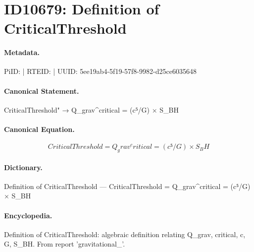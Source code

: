 \section*{ID10679: Definition of CriticalThreshold}
\paragraph{Metadata.}
PiID:  | RTEID:  | UUID: 5ee19ab4-5f19-57f8-9982-d25ce6035648

\paragraph{Canonical Statement.}
CriticalThreshold" → Q\_grav\textasciicircum{}critical = (c⁵/G) × S\_BH

\paragraph{Canonical Equation.}
\[
CriticalThreshold = Q_grav^critical = (c⁵/G) × S_BH
\]

\paragraph{Dictionary.}
Definition of CriticalThreshold — CriticalThreshold = Q\_grav\textasciicircum{}critical = (c⁵/G) × S\_BH

\paragraph{Encyclopedia.}
Definition of CriticalThreshold: algebraic definition relating Q\_grav, critical, c, G, S\_BH. From report 'gravitational\_'.

